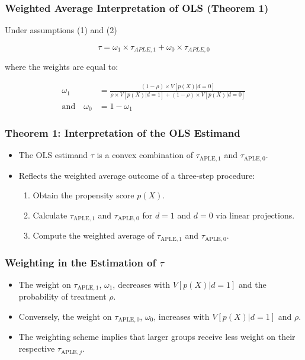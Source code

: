 \documentclass{beamer}
\begin{document}
\begin{frame}
\frametitle{Weighted Average Interpretation of OLS (Theorem 1)}

Under assumptions (1) and (2)

$$\tau = \omega_1 \times \tau_{APLE,1} + \omega_0 \times \tau_{APLE,0}$$
 
 where the weights are equal to:
 
\begin{align*}
\omega_1 &= \frac{(1-\rho) \times V[p(X)|d=0]}{\rho \times V[p(X)|d=1] + (1-\rho) \times V[p(X)|d=0]} \\
\text{and} \quad \omega_0 &= 1 - \omega_1
\end{align*}

\end{frame}



\begin{frame}
\frametitle{Theorem 1: Interpretation of the OLS Estimand}
\begin{itemize}
    \item The OLS estimand \( \tau \) is a convex combination of \( \tau_{\text{APLE},1} \) and \( \tau_{\text{APLE},0} \).
    \item Reflects the weighted average outcome of a three-step procedure:
    \begin{enumerate}
        \item Obtain the propensity score \( p(X) \).
        \item Calculate \( \tau_{\text{APLE},1} \) and \( \tau_{\text{APLE},0} \) for \( d = 1 \) and \( d = 0 \) via linear projections.
        \item Compute the weighted average of \( \tau_{\text{APLE},1} \) and \( \tau_{\text{APLE},0} \).
    \end{enumerate}
\end{itemize}
\end{frame}


\begin{frame}
\frametitle{Weighting in the Estimation of \( \tau \)}
\begin{itemize}
    \item The weight on \( \tau_{\text{APLE},1} \), \( \omega_1 \), decreases with \( V[p(X) | d = 1] \) and the probability of treatment \( \rho \).
    \item Conversely, the weight on \( \tau_{\text{APLE},0} \), \( \omega_0 \), increases with \( V[p(X) | d = 1] \) and \( \rho \).
    \item The weighting scheme implies that larger groups receive less weight on their respective \( \tau_{\text{APLE},j} \).
\end{itemize}
\end{frame}
\end{document}
